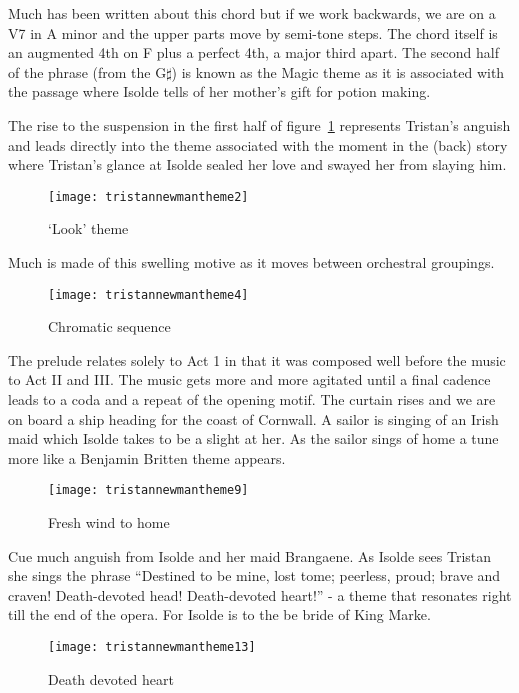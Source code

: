 Much has been written about this chord but if we work backwards, we are on a V7 in A minor and the upper parts move by semi-tone steps. The chord itself is an augmented 4th on F plus a perfect 4th, a major third apart. The second half of the phrase (from the G$\sharp$) is known as the Magic theme as it is associated with the passage where Isolde tells of her mother's gift for potion making. 


The rise to the suspension in the first half of figure~\ref{fig:tristannewman2} represents Tristan's anguish and leads directly into the theme associated with the moment in the (back) story where Tristan's glance at Isolde sealed her love and swayed her from slaying him.  

\begin{figure}[h]
\centering
\texttt{[image: tristannewmantheme2]}\caption{`Look' theme}
\label{fig:tristannewman2}
\end{figure}

Much is made of this swelling motive as it moves between orchestral groupings. 

\begin{figure}[H]
\centering
\texttt{[image: tristannewmantheme4]}\caption{Chromatic sequence}
\label{fig:tristanchromaticsequence}
\end{figure}

The prelude relates solely to Act 1 in that it was composed well before the music to Act II and III. The music gets more and more agitated until a final cadence leads to a coda and a repeat of the opening motif. The curtain rises and we are on board a ship heading for the coast of Cornwall. A sailor is singing of an Irish maid which Isolde takes to be a slight at her. As the sailor sings of home a tune more like a Benjamin Britten theme appears. 

\begin{figure}[H]
\centering
\texttt{[image: tristannewmantheme9]}\caption{Fresh wind to home}
\label{fig:tristanfreshwind}
\end{figure}

Cue much anguish from Isolde and her maid Brangaene. As Isolde sees Tristan she sings the phrase ``Destined to be mine, lost tome; peerless, proud; brave and craven! Death-devoted head! Death-devoted heart!'' - a theme that resonates right till the end of the opera. For Isolde is to the be bride of King Marke.

\begin{figure}[H]
\centering
\texttt{[image: tristannewmantheme13]}\caption{Death devoted heart}
\label{fig:tristandeathdevotedheart}
\end{figure}
 
